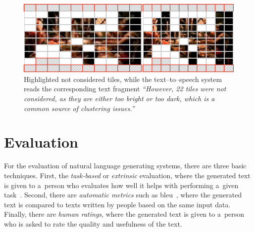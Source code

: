 \documentclass{article}
\begin{document}
\begin{figure}[t!]
  \centering
  \includegraphics[width=0.75\linewidth]{./tile-highlight.png}
  \caption{Highlighted not considered tiles, while the text--to--speech system reads the corresponding text fragment \textit{``However, 22 tiles were not considered, as they are either too bright or too dark, which is a common source of clustering issues.''}}
  \label{fig:tile-highlight}
\end{figure}


\section{Evaluation}
\label{sec:evaluation}
For the evaluation of natural language generating systems, there are three basic techniques. First, the \emph{task-based} or \emph{extrinsic} evaluation,
where the generated text is given to a~person who evaluates how well it helps with performing a~given task~\cite{portet2009nlg}. Second, there are \emph{automatic metrics} such as {\sc bleu}~\cite{papineni2002bleu}, where the generated text is compared to texts written by people based on the same input data. Finally, there are \emph{human ratings}, where the generated text is given to a~person who is asked to rate the quality and usefulness of the text.
\end{document}
